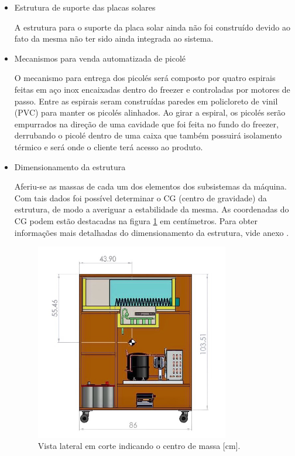  \begin{itemize}
\item Estrutura de suporte das placas solares

A estrutura para o suporte da placa solar ainda não foi construído devido ao fato da mesma não ter sido ainda integrada ao sistema.
\item Mecanismos para venda automatizada de picolé

O mecanismo para entrega dos picolés será composto por quatro espirais feitas em aço inox encaixadas dentro do freezer e controladas por motores de passo. Entre as espirais seram construídas paredes em policloreto de vinil (PVC) para manter os picolés alinhados. Ao girar a espiral, os picolés serão empurrados na direção de uma cavidade que foi feita no fundo do freezer, derrubando o picolé dentro de uma caixa que também possuirá isolamento térmico e será onde o cliente terá acesso ao produto.
\item Dimensionamento da estrutura

Aferiu-se as massas de cada um dos elementos dos subsistemas da máquina. Com tais dados foi possível determinar o CG (centro de gravidade) da estrutura, de modo a averiguar a estabilidade da mesma. As coordenadas do CG podem estão destacadas na figura \ref{fig:cad_vista_lateral} em centímetros. Para obter informações mais detalhadas do dimensionamento da estrutura, vide anexo \label{app:visao_explodida}.

   \begin{figure}[H]
	\centering
    \includegraphics[width=0.8\textwidth]{figuras/cad_vista_lateral}
    \caption{Vista lateral em corte indicando o centro de massa [cm].}
    \label{fig:cad_vista_lateral}
\end{figure}



\end{itemize}
